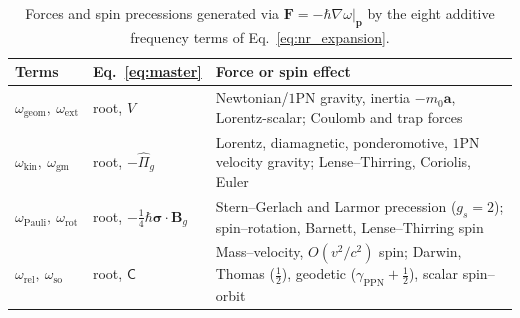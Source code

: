 \documentclass[aps,prl,reprint,superscriptaddress,nofootinbib,floatfix]{revtex4-2}
\theoremstyle{prlthm}
\begin{document}
\begin{table}[t]
\centering
\caption{Forces and spin precessions generated via $\mathbf{F}=-\hbar\nabla\omega|_{\mathbf{p}}$ by the eight additive frequency terms of Eq.~\eqref{eq:nr_expansion}.}
\label{tab:forces}
\begin{ruledtabular}
\begin{tabular}{lll}
\textbf{Terms} & \textbf{Eq.~\eqref{eq:master}} & \textbf{Force or spin effect} \\
\hline
$\omega_\text{geom},\ \omega_\text{ext}$ & root, $V$ & Newtonian/$1$PN gravity, inertia $-m_0\mathbf{a}$, Lorentz-scalar; Coulomb and trap forces \\
$\omega_\text{kin},\ \omega_\text{gm}$ & root, $-\hat{\Pi}_g$ & Lorentz, diamagnetic, ponderomotive, $1$PN velocity gravity; Lense--Thirring, Coriolis, Euler \\
$\omega_\text{Pauli},\ \omega_\text{rot}$ & root, $-\tfrac{1}{4}\hbar\boldsymbol{\sigma}\!\cdot\!\mathbf{B}_g$ & Stern--Gerlach and Larmor precession ($g_s=2$); spin--rotation, Barnett, Lense--Thirring spin \\
$\omega_\text{rel},\ \omega_\text{so}$ & root, $\mathsf{C}$ & Mass--velocity, $O(v^2/c^2)$ spin; Darwin, Thomas ($\tfrac{1}{2}$), geodetic ($\gamma_\text{PPN}+\tfrac{1}{2}$), scalar spin--orbit \\
\end{tabular}
\end{ruledtabular}
\end{table}
\end{document}
